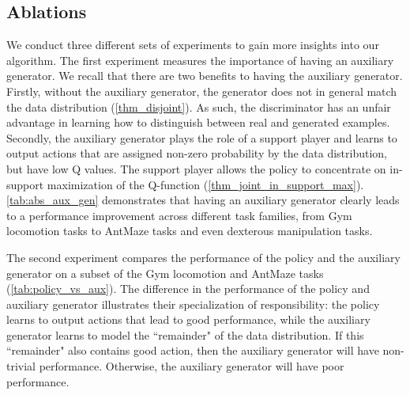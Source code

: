 



\subsection{Ablations}

We conduct three different sets of experiments to gain more insights into our algorithm. The first experiment measures the importance of having an auxiliary generator. We recall that there are two benefits to having the auxiliary generator. Firstly, without the auxiliary generator, the generator does not in general match the data distribution (\autoref{thm_disjoint}). As such, the discriminator has an unfair advantage in learning how to distinguish between real and generated examples. Secondly, the auxiliary generator plays the role of a support player and learns to output actions that are assigned non-zero probability by the data distribution, but have low Q values. The support player allows the policy to concentrate on in-support maximization of the Q-function (\autoref{thm_joint_in_support_max}). \autoref{tab:abs_aux_gen} demonstrates that having an auxiliary generator clearly leads to a performance improvement across different task families, from Gym locomotion tasks to AntMaze tasks and even dexterous manipulation tasks.

The second experiment compares the performance of the policy and the auxiliary generator on a subset of the Gym locomotion and AntMaze tasks (\autoref{tab:policy_vs_aux}). The difference in the performance of the policy and auxiliary generator illustrates their specialization of responsibility: the policy learns to output actions that lead to good performance, while the auxiliary generator learns to model the ``remainder" of the data distribution. If this ``remainder" also contains good action, then the auxiliary generator will have non-trivial performance. Otherwise, the auxiliary generator will have poor performance. 

